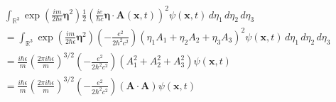 \documentclass[12pt]{article}
\newcommand\INT{\int_{\mathbb R^3}}
\begin{document}
\begin{align*}
&
\INT
\exp\left(\frac{im}{2\hbar\epsilon}\boldsymbol\eta^2\right)
\frac{1}{2}\left(\frac{ie}{\hbar c}\boldsymbol\eta\cdot\mathbf A(\mathbf x,t)\right)^2
\psi(\mathbf x,t)
\,d\eta_1\,d\eta_2\,d\eta_3
\\
&{}
=\INT
\exp\left(\frac{im}{2\hbar\epsilon}\boldsymbol\eta^2\right)
\left(-\frac{e^2}{2\hbar^2 c^2}\right)
(\eta_1A_1+\eta_2A_2+\eta_3A_3)^2
\psi(\mathbf x,t)
\,d\eta_1\,d\eta_2\,d\eta_3
\\
&{}=\frac{i\hbar\epsilon}{m}
\left(\frac{2\pi i\hbar\epsilon}{m}\right)^{3/2}
\left(-\frac{e^2}{2\hbar^2 c^2}\right)
(A_1^2+A_2^2+A_3^2)\psi(\mathbf x,t)
\\
&{}=\frac{i\hbar\epsilon}{m}
\left(\frac{2\pi i\hbar\epsilon}{m}\right)^{3/2}
\left(-\frac{e^2}{2\hbar^2 c^2}\right)
(\mathbf A\cdot\mathbf A)\psi(\mathbf x,t)
\tag{13}
\end{align*}
\end{document}
